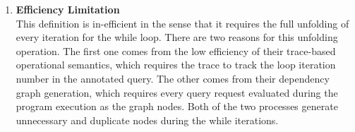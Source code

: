 {\begin{enumerate}
 It limits the adaptivity defined for the adaptive data analysis program to be w.r.t. one specific
 execution.
 In the other words, this adaptivity definition doesn't correspond to the \emph{adaptivity} for this program,
 but for the program in a certain execution.
 \item \textbf{Efficiency Limitation}
 \\
 This definition is in-efficient in the sense that it requires the full unfolding of every iteration for the while loop.
 There are two reasons for this unfolding operation.
 The first one comes from the low efficiency of their trace-based operational semantics,
 which requires the trace to track the loop iteration number in the annotated query.
 The other comes from their dependency graph generation, which requires every query request evaluated during the program execution
 as the graph nodes.
 Both of the two processes generate unnecessary and duplicate nodes during the while iterations.
\end{enumerate}
}
